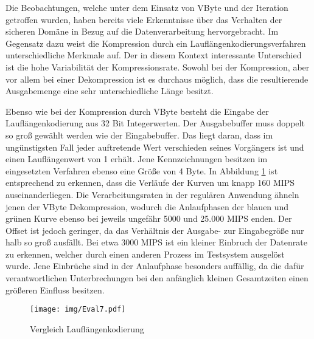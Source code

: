 Die Beobachtungen, welche unter dem Einsatz von VByte und der Iteration getroffen wurden, haben bereits viele Erkenntnisse über das Verhalten der sicheren Domäne in Bezug auf die Datenverarbeitung hervorgebracht. Im Gegensatz dazu weist die Kompression durch ein Lauflängenkodierungsverfahren unterschiedliche Merkmale auf. Der in diesem Kontext interessante Unterschied ist die hohe Variabilität der Kompressionsrate. Sowohl bei der Kompression, aber vor allem bei einer Dekompression ist es durchaus möglich, dass die resultierende Ausgabemenge eine sehr unterschiedliche Länge besitzt.

Ebenso wie bei der Kompression durch VByte besteht die Eingabe der Lauflängenkodierung aus 32 Bit Integerwerten. Der Ausgabebuffer muss doppelt so groß gewählt werden wie der Eingabebuffer. Das liegt daran, dass im ungünstigsten Fall jeder auftretende Wert verschieden seines Vorgängers ist und einen Lauflängenwert von 1 erhält. Jene Kennzeichnungen besitzen im eingesetzten Verfahren ebenso eine Größe von 4 Byte. In Abbildung \ref{fig:eval7} ist entsprechend zu erkennen, dass die Verläufe der Kurven um knapp 160 MIPS auseinanderliegen. Die Verarbeitungsraten in der regulären Anwendung ähneln jenen der VByte Dekompression, wodurch die Anlaufphasen der blauen und grünen Kurve ebenso bei jeweils ungefähr 5000 und 25.000 MIPS enden. Der Offset ist jedoch geringer, da das Verhältnis der Ausgabe- zur Eingabegröße nur halb so groß ausfällt. Bei etwa 3000 MIPS ist ein kleiner Einbruch der Datenrate zu erkennen, welcher durch einen anderen Prozess im Testsystem ausgelöst wurde. Jene Einbrüche sind in der Anlaufphase besonders auffällig, da die dafür verantwortlichen Unterbrechungen bei den anfänglich kleinen Gesamtzeiten einen größeren Einfluss besitzen.

\begin{figure}[h]
	\texttt{[image: img/Eval7.pdf]}
	\centering
	\caption{Vergleich Lauflängenkodierung}
	\label{fig:eval7}
\end{figure}

